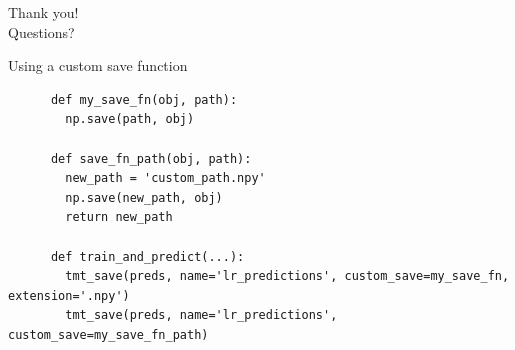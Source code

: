 \documentclass[aspectratio=169,xcolor={dvipsnames}]{beamer}
\begin{document}
  {
    {
      \begin{frame}
          \centering
           \Large Thank you!  \\ 
           \small Questions? 
      \end{frame}
    }
  }

  \appendix
  \begin{frame}[fragile]{Using a custom save function}
    \begin{verbatim}
      def my_save_fn(obj, path):
        np.save(path, obj)

      def save_fn_path(obj, path):
        new_path = 'custom_path.npy'
        np.save(new_path, obj)
        return new_path

      def train_and_predict(...):
        tmt_save(preds, name='lr_predictions', custom_save=my_save_fn, extension='.npy')
        tmt_save(preds, name='lr_predictions', custom_save=my_save_fn_path)

    \end{verbatim}
    
  \end{frame}
\end{document}
